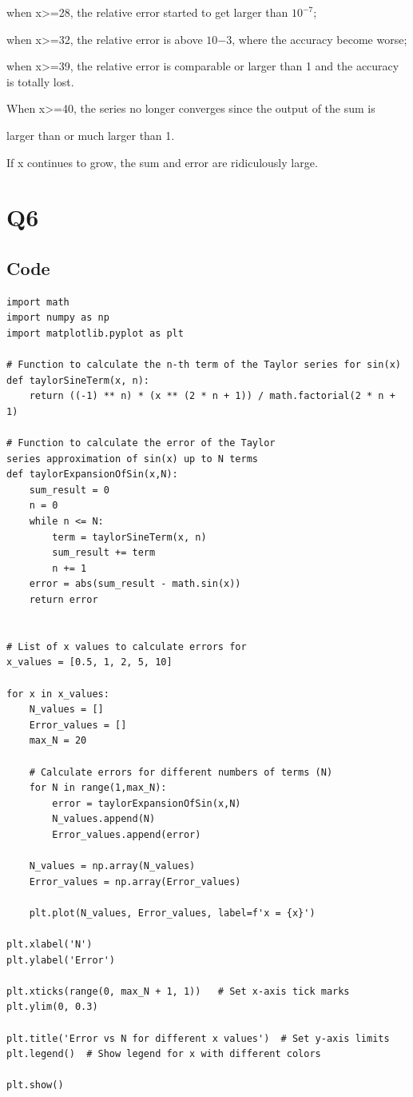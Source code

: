 \documentclass{article}
\begin{document}
when x>=28, the relative error started to get larger than $10^{-7}$; 

when x>=32, the relative error is above $10{-3}$, where the accuracy become worse;

when x>=39, the relative error is comparable or larger than 1 and the accuracy is totally lost.

When x>=40, the series no longer converges since the output of the sum is 

larger than or much larger than 1.

If x continues to grow, the sum and error are ridiculously large.







\section{Q6}
\subsection{Code}
\begin{lstlisting}
import math
import numpy as np
import matplotlib.pyplot as plt

# Function to calculate the n-th term of the Taylor series for sin(x)
def taylorSineTerm(x, n):
    return ((-1) ** n) * (x ** (2 * n + 1)) / math.factorial(2 * n + 1)

# Function to calculate the error of the Taylor 
series approximation of sin(x) up to N terms
def taylorExpansionOfSin(x,N):
    sum_result = 0
    n = 0
    while n <= N:
        term = taylorSineTerm(x, n)
        sum_result += term
        n += 1
    error = abs(sum_result - math.sin(x))
    return error


# List of x values to calculate errors for
x_values = [0.5, 1, 2, 5, 10]

for x in x_values:
    N_values = []
    Error_values = []
    max_N = 20
    
    # Calculate errors for different numbers of terms (N)
    for N in range(1,max_N):
        error = taylorExpansionOfSin(x,N)
        N_values.append(N)
        Error_values.append(error)
    
    N_values = np.array(N_values)
    Error_values = np.array(Error_values)
    
    plt.plot(N_values, Error_values, label=f'x = {x}')

plt.xlabel('N')
plt.ylabel('Error')

plt.xticks(range(0, max_N + 1, 1))   # Set x-axis tick marks
plt.ylim(0, 0.3)

plt.title('Error vs N for different x values')  # Set y-axis limits
plt.legend()  # Show legend for x with different colors

plt.show()




\end{lstlisting}
\end{document}

